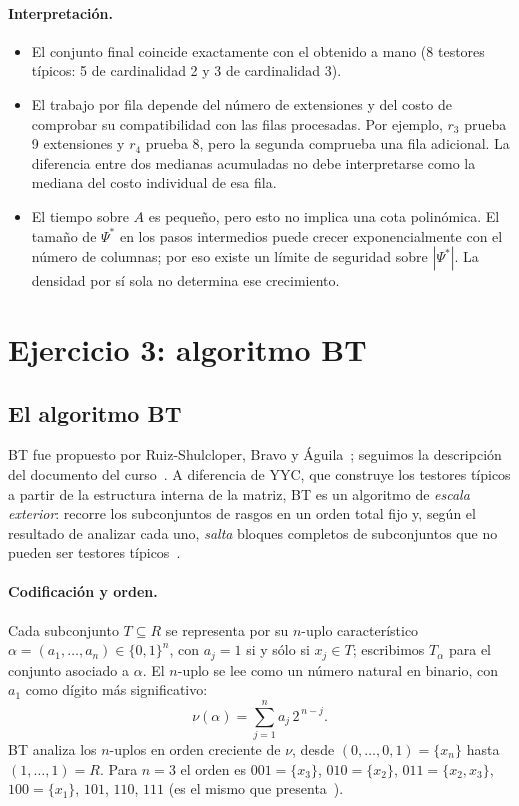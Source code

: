 \documentclass[11pt, a4paper]{article}
\theoremstyle{definition}
\theoremstyle{plain}
\newcommand{\Psis}{\Psi^{*}}
\newcommand{\x}[1]{x_{#1}}
\newcommand{\cj}[1]{\{#1\}}
\begin{document}
\paragraph{Interpretación.}
\begin{itemize}[nosep]
\item El conjunto final coincide exactamente con el obtenido a mano
  (8 testores típicos: 5 de cardinalidad 2 y 3 de cardinalidad 3).
\item El trabajo por fila depende del número de extensiones y del costo de
  comprobar su compatibilidad con las filas procesadas. Por ejemplo, $r_3$
  prueba 9 extensiones y $r_4$ prueba 8, pero la segunda comprueba una fila
  adicional. La diferencia entre dos medianas acumuladas no debe interpretarse
  como la mediana del costo individual de esa fila.
\item El tiempo sobre $A$ es pequeño, pero esto no implica una cota polinómica.
  El tamaño de $\Psis$ en los pasos intermedios puede crecer exponencialmente
  con el número de columnas; por eso existe un límite de seguridad sobre
  $|\Psis|$. La densidad por sí sola no determina ese crecimiento.
\end{itemize}

\section{Ejercicio 3: algoritmo BT}

\subsection{El algoritmo BT}\label{sec:bt}

BT fue propuesto por Ruiz-Shulcloper, Bravo y Águila~\cite{shul82}; seguimos la
descripción del documento del curso~\cite{algobt}. A diferencia
de YYC, que construye los testores típicos a partir de la estructura interna de
la matriz, BT es un algoritmo de \emph{escala exterior}: recorre los
subconjuntos de rasgos en un orden total fijo y, según el resultado de analizar
cada uno, \emph{salta} bloques completos de subconjuntos que no pueden ser
testores típicos~\cite{pons2004}.

\paragraph{Codificación y orden.} Cada subconjunto $T\subseteq R$ se representa
por su $n$-uplo característico $\alpha=(a_1,\dots,a_n)\in\{0,1\}^n$, con $a_j=1$ si
y sólo si $\x j\in T$; escribimos $T_\alpha$ para el conjunto asociado a $\alpha$.
El $n$-uplo se lee como un número natural en binario, con $a_1$ como dígito más
significativo:
\[
\nu(\alpha)=\sum_{j=1}^{n} a_j\,2^{\,n-j}.
\]
BT analiza los $n$-uplos en orden creciente de $\nu$, desde $(0,\dots,0,1)=\cj{\x n}$
hasta $(1,\dots,1)=R$. Para $n=3$ el orden es
$001=\cj{\x3}$, $010=\cj{\x2}$, $011=\cj{\x2,\x3}$, $100=\cj{\x1}$, $101$, $110$, $111$
(es el mismo que presenta~\cite[Tabla 4.1]{pons2004}).
\end{document}
